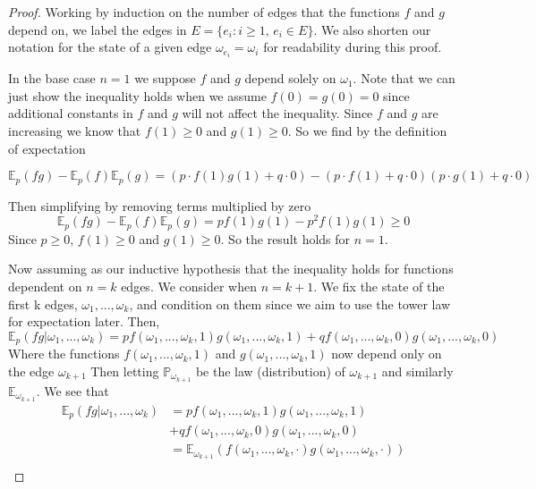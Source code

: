 \documentclass[a4paper,11pt]{article}
\theoremstyle{definition}
\newcommand{\expp}{\mathbb{E}_p}
\begin{document}
\begin{proof}
	Working by induction on the number of edges that the functions $f$ and $g$ depend on, we label the edges in $E = \{e_i : i \geq 1 \text{, } e_i \in E\}$.
	We also shorten our notation for the state of a given edge $\omega_{e_i} = \omega_i$ for readability during this proof.
	

	In the base case $n = 1$ we suppose $f$ and $g$ depend solely on $\omega_1$.
	Note that we can just show the inequality holds when we assume $f(0) = g(0) = 0$ since additional constants in $f$ and $g$ will not affect the inequality. 
	Since $f$ and $g$ are increasing we know that $f(1) \geq 0$ and $g(1) \geq 0$.
	So we find by the definition of expectation 

	$$\expp(fg) - \expp(f)\expp(g) = (p \cdot f(1)g(1) + q \cdot  0) - (p \cdot f(1) + q \cdot 0)(p \cdot g(1) + q \cdot 0) $$
	
	Then simplifying by removing terms multiplied by zero
	$$\expp(fg) - \expp(f)\expp(g) = pf(1)g(1) - p^2f(1)g(1) \geq 0$$
	Since $p\geq 0$, $f(1)\geq 0$ and $g(1) \geq 0$.
	So the result holds for $n=1$.


	Now assuming as our inductive hypothesis that the inequality holds for functions dependent on $n = k$ edges.
	We consider when $ n = k+1$.
	We fix the state of the first k edges, $\omega_1,...,\omega_k$, and condition on them since we aim to use the tower law for expectation later.
	Then,
	$$\expp(fg|\omega_1,...,\omega_k) = p f(\omega_1,...,\omega_k,1)g(\omega_1,...,\omega_k,1)
	+ qf(\omega_1,...,\omega_k,0)g(\omega_1,...,\omega_k,0)$$
	Where the functions $f(\omega_1,...,\omega_k,1)$ and $g(\omega_1,...,\omega_k,1)$ now depend only on the edge $\omega_{k+1}$
	Then letting $ \mathbb{P}_{\omega_{k+1}}$ be the law (distribution) of $\omega_{k+1}$ and similarly $\mathbb{E}_{\omega_{k+1}}$.
	We see that 
	\begin{align*}
		\expp(fg|\omega_1,...,\omega_k) &= p f(\omega_1,...,\omega_k,1)g(\omega_1,...,\omega_k,1)\\
	&+ qf(\omega_1,...,\omega_k,0)g(\omega_1,...,\omega_k,0)\\
	&= \mathbb{E}_{\omega_{k+1}}(f(\omega_1,...,\omega_k,\cdot)g(\omega_1,...,\omega_k,\cdot))\\
	\end{align*}


\end{proof}
\end{document}
